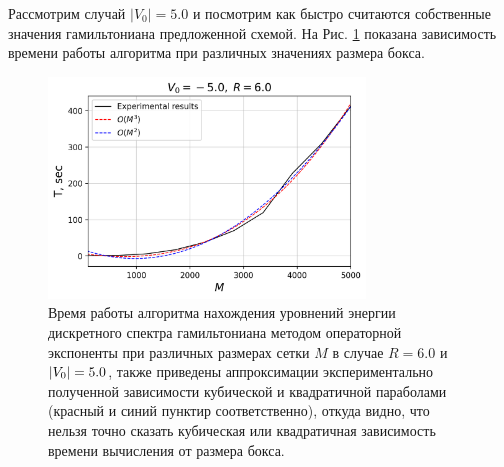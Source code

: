 \documentclass[10pt]{article}
\begin{document}
Рассмотрим случай $|V_0|=5.0$ и посмотрим как быстро считаются собственные значения гамильтониана предложенной схемой. На Рис. \ref{fig:T_vs_M_-5.0} показана зависимость времени работы алгоритма при различных значениях размера бокса.
\begin{figure}[htbp]
    \centering
    \includegraphics[width=0.75\textwidth]{../figures/T_vs_M_-5.0}
    \caption{Время работы алгоритма нахождения уровнений энергии дискретного спектра гамильтониана методом операторной экспоненты при различных размерах сетки $M$ в случае $R=6.0$ и $\abs{V_0}=5.0$, также приведены аппроксимации экспериментально полученной зависимости кубической и квадратичной параболами (красный и синий пунктир соответственно), откуда видно, что нельзя точно сказать кубическая или квадратичная зависимость времени вычисления от размера бокса.}
    \label{fig:T_vs_M_-5.0}
\end{figure}
\end{document}
